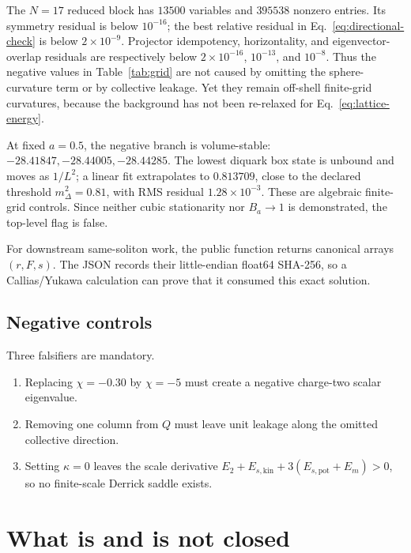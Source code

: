 \documentclass[11pt]{article}
\theoremstyle{definition}
\theoremstyle{remark}
\begin{document}
The \(N=17\) reduced block has \(13500\) variables and \(395538\) nonzero
entries.  Its symmetry residual is below \(10^{-16}\); the best relative
residual in Eq.~\eqref{eq:directional-check} is below \(2\times10^{-9}\).
Projector idempotency, horizontality, and eigenvector-overlap residuals are
respectively below \(2\times10^{-16}\), \(10^{-13}\), and
\(10^{-8}\).  Thus the negative values in Table~\ref{tab:grid} are not
caused by omitting the sphere-curvature term or by collective leakage.  Yet
they remain off-shell finite-grid curvatures, because the background has not
been re-relaxed for Eq.~\eqref{eq:lattice-energy}.

At fixed \(a=0.5\), the negative branch is volume-stable:
\(-28.41847,-28.44005,-28.44285\).  The lowest diquark box state is unbound
and moves as \(1/L^2\); a linear fit extrapolates to \(0.813709\), close to the
declared threshold \(m_\Delta^2=0.81\), with RMS residual
\(1.28\times10^{-3}\).  These are algebraic finite-grid controls.  Since
neither cubic stationarity nor \(B_a\to1\) is demonstrated, the top-level
 flag is false.

For downstream same-soliton work, the public function
 returns canonical
arrays \((r,F,s)\).  The JSON records their little-endian float64 SHA-256, so a
Callias/Yukawa calculation can prove that it consumed this exact solution.

\subsection{Negative controls}

Three falsifiers are mandatory.
\begin{enumerate}[label=(N\arabic*)]
\item Replacing \(\chi=-0.30\) by \(\chi=-5\) must create a negative
  charge-two scalar eigenvalue.
\item Removing one column from \(Q\) must leave unit leakage along the omitted
  collective direction.
\item Setting \(\kappa=0\) leaves the scale derivative
  \(E_2+E_{s,\mathrm{kin}}+3(E_{s,\mathrm{pot}}+E_m)>0\), so no finite-scale
  Derrick saddle exists.
\end{enumerate}

\section{What is and is not closed}
\end{document}
